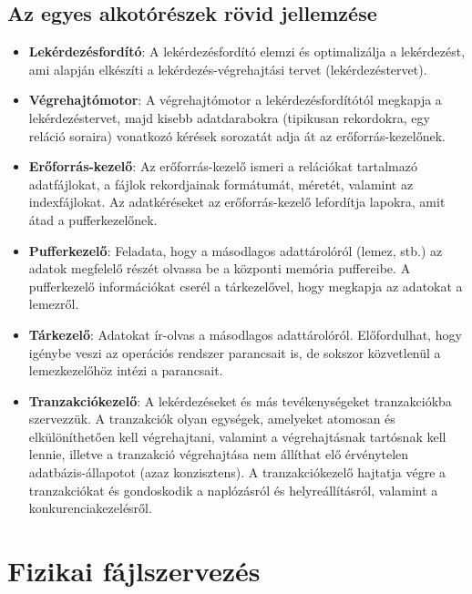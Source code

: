\documentclass[12pt,margin=0px]{article}
\begin{document}
	\subsection*{Az egyes alkotórészek rövid jellemzése}

    \begin{itemize}
        \item \textbf{Lekérdezésfordító}: A lekérdezésfordító elemzi és optimalizálja a lekérdezést, ami alapján elkészíti a lekérdezés-végrehajtási tervet (lekérdezéstervet).
        \item \textbf{Végrehajtómotor}: A végrehajtómotor a lekérdezésfordítótól megkapja a lekérdezéstervet, majd kisebb adatdarabokra (tipikusan rekordokra, egy reláció soraira) vonatkozó kérések sorozatát adja át az erőforrás-kezelőnek.
        \item \textbf{Erőforrás-kezelő}: Az erőforrás-kezelő ismeri a relációkat tartalmazó adatfájlokat, a fájlok rekordjainak formátumát, méretét, valamint az indexfájlokat. Az adatkéréseket az erőforrás-kezelő lefordítja lapokra, amit átad a pufferkezelőnek.
        \item \textbf{Pufferkezelő}: Feladata, hogy a másodlagos adattárolóról (lemez, stb.) az adatok megfelelő részét olvassa be a központi memória puffereibe. A pufferkezelő információkat cserél a tárkezelővel, hogy megkapja az adatokat	a lemezről.
	   \item \textbf{Tárkezelő}: Adatokat ír-olvas a másodlagos adattárolóról. Előfordulhat, hogy igénybe veszi az operációs rendszer parancsait is, de sokszor közvetlenül a lemezkezelőhöz intézi a parancsait.
        \item \textbf{Tranzakciókezelő}: A lekérdezéseket és más tevékenységeket tranzakciókba szervezzük. A tranzakciók olyan egységek, amelyeket atomosan és elkülöníthetően kell végrehajtani, valamint a végrehajtásnak tartósnak kell lennie, illetve a tranzakció végrehajtása nem állíthat elő érvénytelen adatbázis-állapotot (azaz konzisztens). A tranzakciókezelő hajtatja végre a tranzakciókat és gondoskodik a naplózásról és helyreállításról, valamint a konkurenciakezelésről.
    \end{itemize}	

    \section*{Fizikai fájlszervezés}
\end{document}

